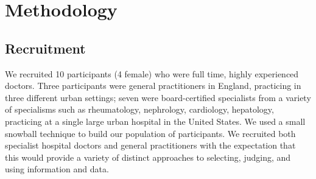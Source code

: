 \documentclass{sigchi}
\begin{document}









\section{Methodology}
\subsection{Recruitment}
We recruited 10 participants (4 female) who were full time, highly experienced doctors.  Three participants were general practitioners in England, practicing in three different urban settings; seven were board-certified specialists from a variety of specialisms such as rheumatology, nephrology, cardiology, hepatology, practicing at a single large urban hospital in the United States.  We used a small snowball technique to build our population of participants.   We recruited both specialist hospital doctors and general practitioners with the expectation that this would provide a variety of distinct approaches to selecting, judging, and using information and data.
\end{document}
